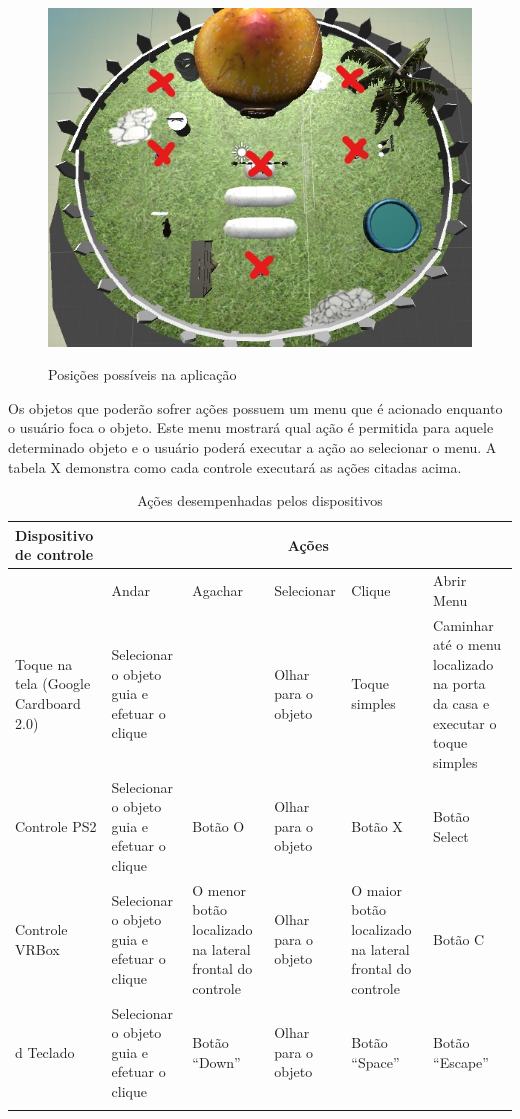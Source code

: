 \begin{figure}[h]
	\caption{\small Posições possíveis na aplicação}
	\centering
	\includegraphics[scale=0.50]{Imagens/posicoes.jpg}
	\label{f.posicoes}
\end{figure}

Os objetos que poderão sofrer ações possuem um menu que é acionado enquanto o usuário foca o objeto. Este menu mostrará qual ação é permitida para aquele determinado objeto e o usuário poderá executar a ação ao selecionar o menu. A tabela X demonstra como cada controle executará as ações citadas acima. 

\begin{longtable}{p{2.5cm}|p{2.5cm}|p{2.5cm}|p{2.5cm}|p{2.5cm}|p{2.5cm}}
	\hline
	\textbf{\small Dispositivo de controle} & \multicolumn{5}{c}{\textbf{\small Ações}}  \\ \hline \hline
	{} & {\small Andar} & {\small Agachar}  & {\small Selecionar} & {\small Clique}  & {\small Abrir Menu}\\\hline \hline
	{\small Toque na tela (Google Cardboard 2.0)} & {\small Selecionar o objeto guia e efetuar o clique} & {\small } &{\small Olhar para o objeto} & {\small Toque simples} & {\small Caminhar até o menu localizado na porta da casa e executar o toque simples}\\\hline		 
	{\small Controle PS2} & {\small Selecionar o objeto guia e efetuar o clique} & {\small Botão O} &{\small Olhar para o objeto} & {\small Botão X} & {\small Botão Select}\\\hline		 
	{\small Controle VRBox} & {\small Selecionar o objeto guia e efetuar o clique} & {\small O menor botão localizado na lateral frontal do controle} &{\small Olhar para o objeto} & {\small O maior botão localizado na lateral frontal do controle} & {\small Botão C}\\\hline  d		 
	{\small Teclado} & {\small Selecionar o objeto guia e efetuar o clique} & {\small Botão “Down”} &{\small Olhar para o objeto} & {\small Botão “Space”} & {\small Botão “Escape”}\\\hline  
	\caption{Ações desempenhadas pelos dispositivos}
	\label{t.acoes}
\end{longtable}



